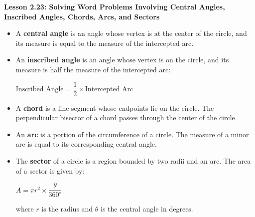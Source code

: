 \begin{center}
\textbf{Lesson 2.23: Solving Word Problems Involving Central Angles, Inscribed Angles, Chords, Arcs, and Sectors}
\end{center}

\vspace*{-1.5ex}

\begin{itemize}
    \item A \textbf{central angle} is an angle whose vertex is at the center of the circle, and its measure is equal to the measure of the intercepted arc.
    \item An \textbf{inscribed angle} is an angle whose vertex is on the circle, and its measure is half the measure of the intercepted arc:

{\centering $
    \text{Inscribed Angle} = \dfrac{1}{2} \times \text{Intercepted Arc}
$\par}
    \item A \textbf{chord} is a line segment whose endpoints lie on the circle. The perpendicular bisector of a chord passes through the center of the circle.
    \item An \textbf{arc} is a portion of the circumference of a circle. The measure of a minor arc is equal to its corresponding central angle.
    \item The \textbf{sector} of a circle is a region bounded by two radii and an arc. The area of a sector is given by:

{\centering $
    A = \pi r^2 \times \dfrac{\theta}{360^\circ}
$\par}
    where $r$ is the radius and $\theta$ is the central angle in degrees.
\end{itemize}
